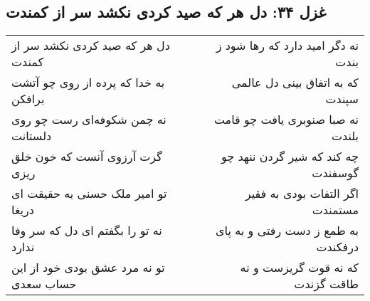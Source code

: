 \begin{center}
\section*{غزل ۳۴: دل هر که صید کردی نکشد سر از کمندت}
\label{sec:034}
\begin{longtable}{l p{0.5cm} r}
دل هر که صید کردی نکشد سر از کمندت
&&
نه دگر امید دارد که رها شود ز بندت
\\
به خدا که پرده از روی چو آتشت برافکن
&&
که به اتفاق بینی دل عالمی سپندت
\\
نه چمن شکوفه‌ای رست چو روی دلستانت
&&
نه صبا صنوبری یافت چو قامت بلندت
\\
گرت آرزوی آنست که خون خلق ریزی
&&
چه کند که شیر گردن ننهد چو گوسفندت
\\
تو امیر ملک حسنی به حقیقت ای دریغا
&&
اگر التفات بودی به فقیر مستمندت
\\
نه تو را بگفتم ای دل که سر وفا ندارد
&&
به طمع ز دست رفتی و به پای درفکندت
\\
تو نه مرد عشق بودی خود از این حساب سعدی
&&
که نه قوت گریزست و نه طاقت گزندت
\\
\end{longtable}
\end{center}
